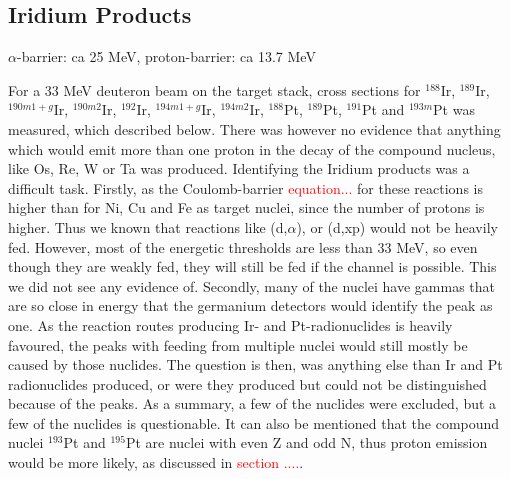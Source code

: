\subsection{Iridium Products}
$\alpha$-barrier: ca 25 MeV, proton-barrier: ca 13.7 MeV

For a 33 MeV deuteron beam on the target stack, cross sections for $^{188}$Ir, $^{189}$Ir,  $^{190m1+g}$Ir, $^{190m2}$Ir, $^{192}$Ir, $^{194m1+g}$Ir, $^{194m2}$Ir, $^{188}$Pt, $^{189}$Pt, $^{191}$Pt and $^{193m}$Pt was measured, which described below. There was however no evidence that anything which would emit more than one proton in the decay of the compound nucleus, like Os, Re, W or Ta was produced. Identifying the Iridium products was a difficult task. Firstly, as the Coulomb-barrier \textcolor{red}{equation...} for these reactions is higher than for Ni, Cu and Fe as target nuclei, since the number of protons is higher. Thus we known that reactions like (d,$\alpha$), or (d,xp) would not be heavily fed. However, most of the energetic thresholds are less than 33 MeV, so even though they are weakly fed, they will still be fed if the channel is possible. This we did not see any evidence of. Secondly, many of the nuclei have gammas that are so close in energy that the germanium detectors would identify the peak as one. As the reaction routes producing Ir- and Pt-radionuclides is heavily favoured, the peaks with feeding from multiple nuclei would still mostly be caused by those nuclides. The question is then, was anything else than Ir and Pt radionuclides produced, or were they produced but could not be distinguished because of the peaks. As a summary, a few of the nuclides were excluded, but a few of the nuclides is questionable. It can also be mentioned that the compound nuclei $^{193}$Pt and $^{195}$Pt are nuclei with even Z and odd N, thus proton emission would be more likely, as discussed in \textcolor{red}{section ....}.  \\


